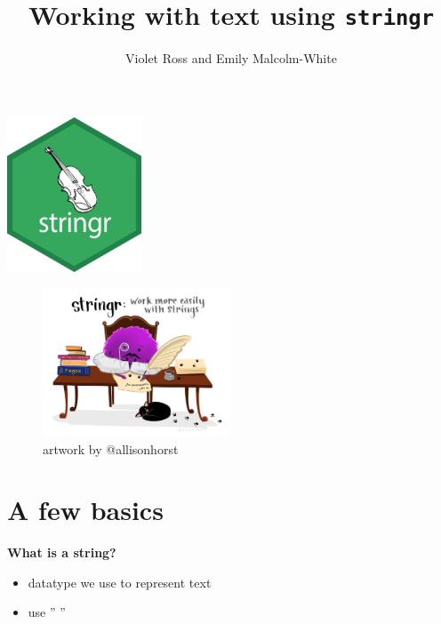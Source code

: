 \documentclass[
  letterpaper,
  DIV=11,
  numbers=noendperiod]{scrartcl}
\title{Working with text using \texttt{stringr}}
\author{Violet Ross and Emily Malcolm-White}
\date{}
\providecommand{\tightlist}{%
  \setlength{\itemsep}{0pt}\setlength{\parskip}{0pt}}\usepackage{longtable,booktabs,array}
\begin{document}
\maketitle
\ifdefined\Shaded\renewenvironment{Shaded}{\begin{tcolorbox}[enhanced, interior hidden, breakable, sharp corners, borderline west={3pt}{0pt}{shadecolor}, frame hidden, boxrule=0pt]}{\end{tcolorbox}}\fi

\includegraphics[width=0.3\textwidth,height=\textheight]{118_Q_stringr_files/mediabag/logo.png}

\begin{figure}

{\centering \includegraphics[width=0.5\textwidth,height=\textheight]{118_Q_stringr_files/mediabag/6bbcc35c-1863-49df-8.png}

}

\caption{artwork by @allisonhorst}

\end{figure}

\hypertarget{a-few-basics}{%
\section{A few basics}\label{a-few-basics}}

\textbf{What is a string?}

\begin{itemize}
\tightlist
\item
  datatype we use to represent text
\item
  use '' ''
\end{itemize}
\end{document}
